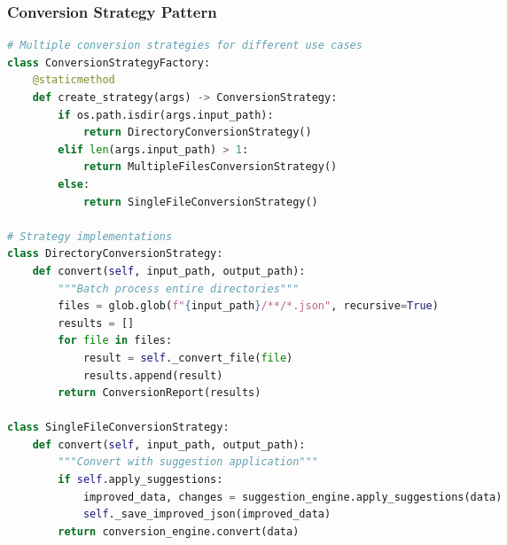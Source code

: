 \begin{frame}[fragile,t]
\frametitle{Conversion Strategy Pattern}
\begin{adjustbox}{max width=\textwidth, max height=\textheight,keepaspectratio}
\begin{lstlisting}[language=Python,basicstyle=\fontsize{5}{6}\selectfont\ttfamily]
# Multiple conversion strategies for different use cases
class ConversionStrategyFactory:
    @staticmethod
    def create_strategy(args) -> ConversionStrategy:
        if os.path.isdir(args.input_path):
            return DirectoryConversionStrategy()
        elif len(args.input_path) > 1:
            return MultipleFilesConversionStrategy()
        else:
            return SingleFileConversionStrategy()

# Strategy implementations
class DirectoryConversionStrategy:
    def convert(self, input_path, output_path):
        """Batch process entire directories"""
        files = glob.glob(f"{input_path}/**/*.json", recursive=True)
        results = []
        for file in files:
            result = self._convert_file(file)
            results.append(result)
        return ConversionReport(results)

class SingleFileConversionStrategy:
    def convert(self, input_path, output_path):
        """Convert with suggestion application"""
        if self.apply_suggestions:
            improved_data, changes = suggestion_engine.apply_suggestions(data)
            self._save_improved_json(improved_data)
        return conversion_engine.convert(data)
\end{lstlisting}
\end{adjustbox}
\end{frame}

